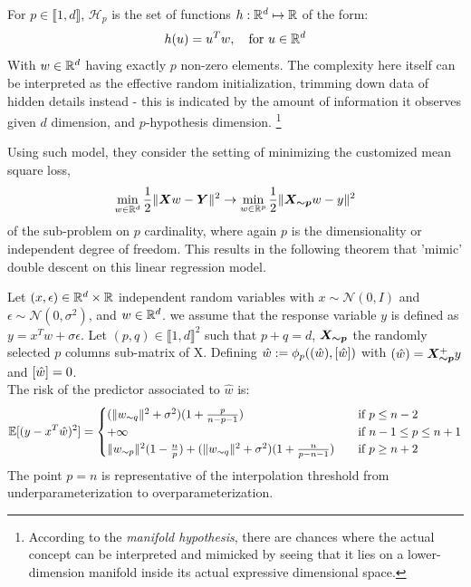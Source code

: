 \documentclass[10pt]{article} %
\begin{document}
\begin{definition}
For $p \in \llbracket1,d\rrbracket$, $\mathcal{H}_p$ is the set of functions $h:\mathbb{R}^d\mapsto \mathbb{R}$ of the form:
$$
h(u)=u^Tw,\quad \text{for }u \in \mathbb{R}^d
$$
With $w \in \mathbb{R}^d$ having exactly $p$ non-zero elements. The complexity here itself can be interpreted as the effective random initialization, trimming down data of hidden details instead - this is indicated by the amount of information it observes given $d$ dimension, and $p$-hypothesis dimension. \footnote{According to the \textit{manifold hypothesis}, there are chances where the actual concept can be interpreted and mimicked by seeing that it lies on a lower-dimension manifold inside its actual expressive dimensional space. }
\end{definition}
Using such model, they consider the setting of minimizing the customized mean square loss, 
\begin{equation}
\label{eq:linear_gaussian_erm}
\min_{w\in \mathbb{R}^d} \frac{1}{2}\lVert \bm{X} w - \bm{Y} \rVert^2 \to \min_{w\in \mathbb{R}^p} \frac{1}{2}\lVert \bm{X_{\sim p}} w - y \rVert^2
\end{equation}
of the sub-problem on $p$ cardinality, where again $p$ is the dimensionality or independent degree of freedom. This results in the following theorem that 'mimic' double descent on this linear regression model.
\begin{theorem}
\label{thm:double_descent_lr}
Let $(x, \epsilon)\in \mathbb{R}^d\times\mathbb{R}$ independent random variables with $x \sim \mathcal{N}(0,I)$  and $\epsilon \sim \mathcal{N}(0,\sigma^2)$, and $w \in \mathbb{R}^d$. we assume that the response variable $y$ is defined as $y=x^Tw +\sigma \epsilon$. Let $(p,q) \in \llbracket 1, d\rrbracket^2$ such that $p+q=d$, $\bm{X_{\sim p}}$ the randomly selected $p$ columns sub-matrix of X. Defining $\hat w:=\phi_p(({\hat w}),[{\hat w}])$ with $({\hat w})=\bm{X_{\sim p}}^+y$ and $[{\hat w}] = 0$.\\
The risk of the predictor associated to $\hat w$ is:
\begin{equation}
    \mathbb{E}[(y-x^T\hat w)^2] = 
\begin{cases}
(\lVert w_{\sim q} \rVert^2+\sigma^2)(1+\frac{p}{n-p-1}) &\quad\text{if } p\leq  n-2\\
+\infty &\quad\text{if }n-1 \leq p\leq  n+1\\
\lVert w_{\sim p} \rVert^2(1-\frac{n}{p}) +  (\lVert w_{\sim q} \rVert^2+\sigma^2)(1+\frac{n}{p-n-1}) &\quad\text{if }p\geq n+2\end{cases}
\end{equation}
The point $p=n$ is representative of the interpolation threshold from underparameterization to overparameterization. 
\end{theorem}
\end{document}
